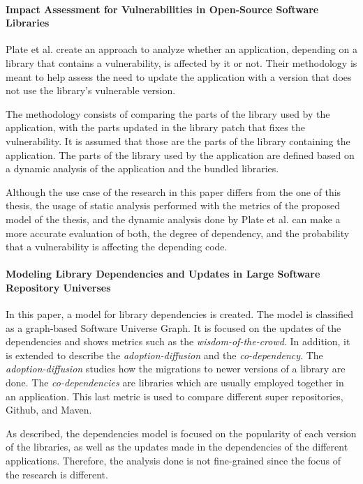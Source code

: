 \paragraph{Impact Assessment for Vulnerabilities in Open-Source Software Libraries \cite{plate2015impact}}
Plate et al. create an approach to analyze whether an application, depending on a library that contains a vulnerability, is affected by it or not. Their methodology is meant to help assess the need to update the application with a version that does not use the library's vulnerable version.

The methodology consists of comparing the parts of the library used by the application, with the parts updated in the library patch that fixes the vulnerability. It is assumed that those are the parts of the library containing the application. The parts of the library used by the application are defined based on a dynamic analysis of the application and the bundled libraries.

Although the use case of the research in this paper differs from the one of this thesis, the usage of static analysis performed with the metrics of the proposed model of the thesis, and the dynamic analysis done by Plate et al. can make a more accurate evaluation of both, the degree of dependency, and the probability that a vulnerability is affecting the depending code.

\paragraph{Modeling Library Dependencies and Updates in Large Software Repository Universes \cite{Kula2017}}
In this paper, a model for library dependencies is created. The model is classified as a graph-based Software Universe Graph. It is focused on the updates of the dependencies and shows metrics such as the \textit{wisdom-of-the-crowd}. In addition, it is extended to describe the \textit{adoption-diffusion} and the \textit{co-dependency}. The \textit{adoption-diffusion} studies how the migrations to newer versions of a library are done. The \textit{co-dependencies} are libraries which are usually employed together in an application. This last metric is used to compare different super repositories, Github, and Maven.

As described, the dependencies model is focused on the popularity of each version of the libraries, as well as the updates made in the dependencies of the different applications. Therefore, the analysis done is not fine-grained since the focus of the research is different.

